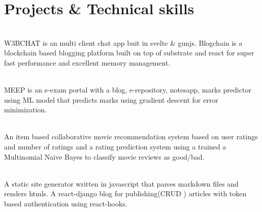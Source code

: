 \documentclass[]{deedy-resume-openfont}
\begin{document}
\section{Projects \& Technical skills}
\raggedright

     \hfill {}\\
    W3BCHAT is an multi client chat app buit in svelte \& gunjs. Blogchain is a blockchain based blogging platform built on top of substrate and react for super fast performance and excellent memory management.\\
    \sectionsep

    \hfill {}\\
    MEEP is an e-exam portal with a blog, e-repository, notesapp, marks predictor using ML model that predicts marks using gradient descent for error minimization.\\
    \sectionsep
  

    \hfill {}\\
    An item based collaborative movie recommendation system based on user ratings and number of ratings and a rating prediction system using a trained a Multinomial Naive Bayes to classify movie reviews as good/bad.\\
    \sectionsep
  

    \hfill {}\\
    A static site generator written in javascript that parses markdown files and renders htmls. A react-django blog for publishing(CRUD ) articles with token based authentication using react-hooks. \\
    \sectionsep
  
\end{document}
